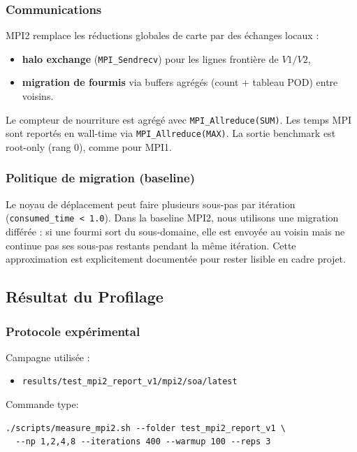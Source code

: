 \subsubsection{Communications}

MPI2 remplace les réductions globales de carte par des échanges locaux :
\begin{itemize}[leftmargin=*]
  \item \textbf{halo exchange} (\texttt{MPI\_Sendrecv}) pour les lignes frontière
  de \(V1/V2\),
  \item \textbf{migration de fourmis} via buffers agrégés (count + tableau POD)
  entre voisins.
\end{itemize}

Le compteur de nourriture est agrégé avec \texttt{MPI\_Allreduce(SUM)}.
Les temps MPI sont reportés en wall-time via \texttt{MPI\_Allreduce(MAX)}.
La sortie benchmark est root-only (rang 0), comme pour MPI1.

\subsubsection{Politique de migration (baseline)}

Le noyau de déplacement peut faire plusieurs sous-pas par itération
(\texttt{consumed\_time < 1.0}).
Dans la baseline MPI2, nous utilisons une migration différée :
si une fourmi sort du sous-domaine, elle est envoyée au voisin mais ne continue
pas ses sous-pas restants pendant la même itération.
Cette approximation est explicitement documentée pour rester lisible en cadre projet.

\subsection{Résultat du Profilage}

\subsubsection{Protocole expérimental}

Campagne utilisée :
\begin{itemize}[leftmargin=*]
  \item \texttt{results/test\_mpi2\_report\_v1/mpi2/soa/latest}
\end{itemize}

Commande type:
\begin{verbatim}
./scripts/measure_mpi2.sh --folder test_mpi2_report_v1 \
  --np 1,2,4,8 --iterations 400 --warmup 100 --reps 3
\end{verbatim}

